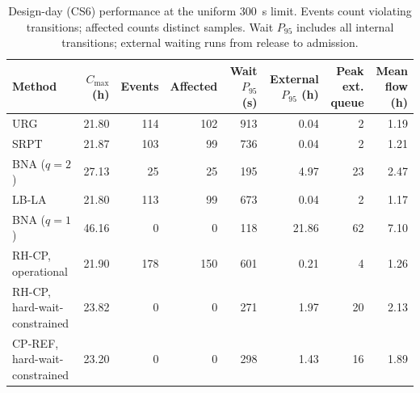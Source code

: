 \begin{table}[tbp]
\caption{Design-day (CS6) performance at the uniform 300~s limit. Events count violating transitions; affected counts distinct samples. Wait $P_{95}$ includes all internal transitions; external waiting runs from release to admission.\label{tab:kpi-cs6}}
\centering
\footnotesize
\setlength{\tabcolsep}{3pt}
\begin{tabular*}{\textwidth}{@{\extracolsep{\fill}}lrrrrrrr@{}}
\toprule
Method & \shortstack{$C_{\max}$\\(h)} & Events & Affected & \shortstack{Wait\\$P_{95}$ (s)} & \shortstack{External\\$P_{95}$ (h)} & \shortstack{Peak ext.\\queue} & \shortstack{Mean flow\\(h)}\\
\midrule
URG & 21.80 & 114 & 102 & 913 & 0.04 & 2 & 1.19\\
SRPT & 21.87 & 103 & 99 & 736 & 0.04 & 2 & 1.21\\
BNA ($q=2$) & 27.13 & 25 & 25 & 195 & 4.97 & 23 & 2.47\\
LB-LA & 21.80 & 113 & 99 & 673 & 0.04 & 2 & 1.17\\
BNA ($q=1$) & 46.16 & 0 & 0 & 118 & 21.86 & 62 & 7.10\\
\midrule
RH-CP, operational & 21.90 & 178 & 150 & 601 & 0.21 & 4 & 1.26\\
RH-CP, hard-wait-constrained & 23.82 & 0 & 0 & 271 & 1.97 & 20 & 2.13\\
CP-REF, hard-wait-constrained & 23.20 & 0 & 0 & 298 & 1.43 & 16 & 1.89\\
\bottomrule
\end{tabular*}
\end{table}
